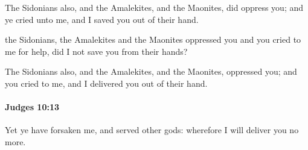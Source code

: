 			\begin{versebox}
					\item[BHS] 
					\item[ASV] The Sidonians also, and the Amalekites, and the Maonites, did oppress you; and ye cried unto me, and I saved you out of their hand.
					\item[NIV] the Sidonians, the Amalekites and the Maonites oppressed you and you cried to me for help, did I not save you from their hands?
					\item[NRSV] The Sidonians also, and the Amalekites, and the Maonites, oppressed you; and you cried to me, and I delivered you out of their hand.
			\end{versebox}

		\paragraph{Judges 10:13} %
			\label{JUDGES-10-13}

			Yet ye have forsaken me, and served other gods: wherefore I will deliver you no more.

